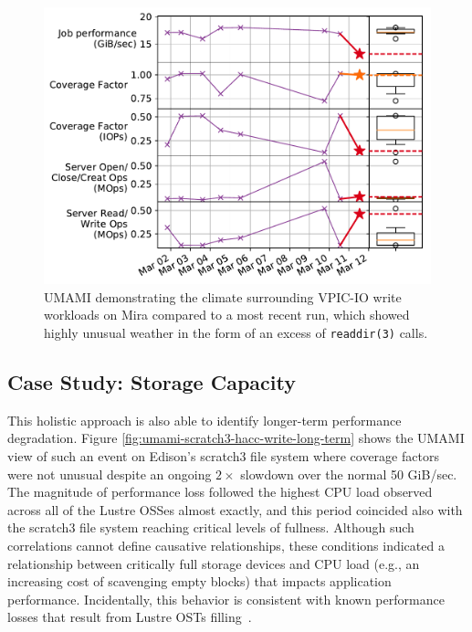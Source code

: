 \begin{figure}[t]
    \centering
    \includegraphics[width=1.0\columnwidth]{figs/umami-mira-fs1-vpic-write.pdf}
    \caption{UMAMI demonstrating the climate surrounding VPIC-IO write workloads on Mira compared to a most recent run, which showed highly unusual weather in the form of an excess of \texttt{readdir(3)} calls.
    }
    \label{fig:umami-mira-fs1-vpic-write}
\vspace{-.2in}
\end{figure}

\subsection{Case Study: Storage Capacity}

This holistic approach is also able to identify longer-term performance degradation.
Figure \ref{fig:umami-scratch3-hacc-write-long-term} shows the UMAMI view of such an event on Edison's scratch3 file system where coverage factors were not unusual despite an ongoing $2\times$ slowdown over the normal 50 GiB/sec.
The magnitude of performance loss followed the highest CPU load observed across all of the Lustre OSSes almost exactly, and this period coincided also with the scratch3 file system reaching critical levels of fullness.
Although such correlations cannot define causative relationships, these conditions indicated a relationship between critically full storage devices and CPU load (e.g., an increasing cost of scavenging empty blocks) that impacts application performance.
Incidentally, this behavior is consistent with known performance losses that result from Lustre OSTs filling~\cite{oral2014best}.
 
